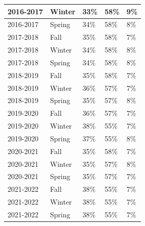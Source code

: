 \documentclass[10]{article}
\begin{document}
\begin{longtable}[c]{|l|l|l|l|l|}
	2016-2017              & Winter        & 33\%           & 58\%             & 9\%              \\ \hline
	2016-2017              & Spring        & 34\%           & 58\%             & 8\%              \\ \hline
	2017-2018              & Fall          & 35\%           & 58\%             & 7\%              \\ \hline
	2017-2018              & Winter        & 34\%           & 58\%             & 8\%              \\ \hline
	2017-2018              & Spring        & 34\%           & 58\%             & 8\%              \\ \hline
	2018-2019              & Fall          & 35\%           & 58\%             & 7\%              \\ \hline
	2018-2019              & Winter        & 36\%           & 57\%             & 7\%              \\ \hline
	2018-2019              & Spring        & 35\%           & 57\%             & 8\%              \\ \hline
	2019-2020              & Fall          & 36\%           & 57\%             & 7\%              \\ \hline
	2019-2020              & Winter        & 38\%           & 55\%             & 7\%              \\ \hline
	2019-2020              & Spring        & 37\%           & 55\%             & 8\%              \\ \hline
	2020-2021              & Fall          & 35\%           & 58\%             & 7\%              \\ \hline
	2020-2021              & Winter        & 35\%           & 57\%             & 8\%              \\ \hline
	2020-2021              & Spring        & 35\%           & 57\%             & 7\%              \\ \hline
	2021-2022              & Fall          & 38\%           & 55\%             & 7\%              \\ \hline
	2021-2022              & Winter        & 38\%           & 55\%             & 7\%              \\ \hline
	2021-2022              & Spring        & 38\%           & 55\%             & 7\%              \\ \hline
\end{longtable}
\end{document}
